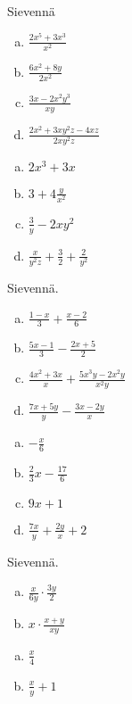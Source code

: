 \begin{tehtava}
Sievennä
	\begin{enumerate}[a)]
	\item $\frac{2x^5+3x^3}{x^2}$
	\item $\frac{6x^2+8y}{2x^2}$
	\item $\frac{3x-2x^2y^3}{xy}$
	\item $\frac{2x^2+3xy^2z-4xz}{2xy^2z}$
	\end{enumerate}

\begin{vastaus}
	\begin{enumerate}[a)]
	\item $2x^3+3x$
	\item $3+4 \frac{y}{x^2}$
	\item $\frac{3}{y} - 2xy^2$
	\item $\frac{x}{y^2z} + \frac{3}{2} + \frac{2}{y^2}$
	\end{enumerate}
\end{vastaus}
\end{tehtava}

\begin{tehtava}
Sievennä.
	\begin{enumerate}[a)]
	\item $ \frac{1-x}{3} + \frac{x-2}{6}$
	\item $ \frac{5x-1}{3} - \frac{2x+5}{2}$
	\item $\frac{4x^2+3x}{x} + \frac{5x^3y-2x^2y}{x^2y}$
	\item $\frac{7x+5y}{y} - \frac{3x-2y}{x}$
	\end{enumerate}

\begin{vastaus}
	\begin{enumerate}[a)]
	\item $ -\frac{x}{6}$
	\item $ \frac{2}{3} x - \frac{17}{6}$
	\item $9x+1$
	\item $\frac{7x}{y} + \frac{2y}{x} +2$
	\end{enumerate}
\end{vastaus}
\end{tehtava}

\begin{tehtava}
Sievennä.
	\begin{enumerate}[a)]
	\item $\frac{x}{6y} \cdot \frac{3y}{2}$
	\item $x \cdot \frac{x+y}{xy}$
	\end{enumerate}

\begin{vastaus}
	\begin{enumerate}[a)]
	\item $\frac{x}{4}$
	\item $\frac{x}{y} + 1$
	\end{enumerate}
\end{vastaus}
\end{tehtava}


